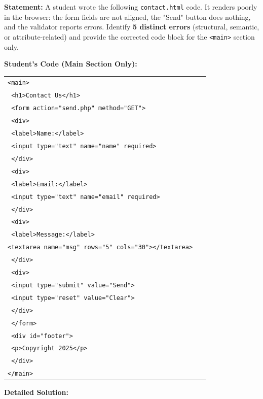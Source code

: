 \documentclass[11pt]{article}
\begin{document}
\begin{exoresolu}
\textbf{Statement:} A student wrote the following \texttt{contact.html} code. It renders poorly in the browser: the form fields are not aligned, the "Send" button does nothing, and the validator reports errors. Identify \textbf{5 distinct errors} (structural, semantic, or attribute-related) and provide the corrected code block for the \texttt{<main>} section only.

\textbf{Student's Code (Main Section Only):}
\begin{center}
\begin{tabular}{|p{0.95\linewidth}|}\hline
\texttt{<main>}\\
\texttt{  <h1>Contact Us</h1>}\\
\texttt{  <form action="send.php" method="GET">}\\
\texttt{    <div>}\\
\texttt{      <label>Name:</label>}\\
\texttt{      <input type="text" name="name" required>}\\
\texttt{    </div>}\\
\texttt{    <div>}\\
\texttt{      <label>Email:</label>}\\
\texttt{      <input type="text" name="email" required>}\\
\texttt{    </div>}\\
\texttt{    <div>}\\
\texttt{      <label>Message:</label>}\\
\texttt{<textarea name="msg" rows="5" cols="30"></textarea>}\\
\texttt{    </div>}\\
\texttt{    <div>}\\
\texttt{      <input type="submit" value="Send">}\\
\texttt{      <input type="reset" value="Clear">}\\
\texttt{    </div>}\\
\texttt{  </form>}\\
\texttt{  <div id="footer">}\\
\texttt{    <p>Copyright 2025</p>}\\
\texttt{  </div>}\\
\texttt{</main>}\\\hline
\end{tabular}
\end{center}
\tcblower
\textbf{Detailed Solution:}


\end{exoresolu}
\end{document}
